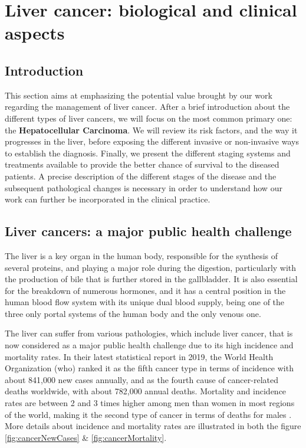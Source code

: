 \chapter{Liver cancer: biological and clinical aspects} \label{liverCancer}

\section{Introduction}

This section aims at emphasizing the potential value brought by our work
regarding the management of liver cancer.
After a brief introduction about the different types of liver cancers,
we will focus on the most common primary one: the \textbf{Hepatocellular
Carcinoma}. We will review its risk factors, and the way it progresses in
the liver, before exposing the different invasive or non-invasive ways
to establish the diagnosis. Finally, we present the
different staging systems and treatments available to provide the better
chance of survival to the diseased patients. A precise description of
the different stages of the disease and the subsequent pathological
changes is necessary in order to understand how our work can further be
incorporated in the clinical practice.

\section{Liver cancers: a major public health challenge}\label{liver_cancer_description}

The liver is a key organ in the human body, responsible for the
synthesis of several proteins, and playing a major role during the
digestion, particularly with the production of bile that is further
stored in the gallbladder. It is also essential for the breakdown of
numerous hormones, and it has a central position in the human blood flow
system with its unique dual blood supply, being one of the three only portal
systems of the human body and the only venous one.

The liver can suffer from various pathologies, which
include liver cancer, that is now considered as a major public health
challenge due to its high incidence and mortality rates. In their latest
statistical report in 2019, the World Health Organization (\ac{who}) ranked it as the fifth
cancer type in terms of incidence with about 841,000 new cases annually,
and as the fourth cause of cancer-related deaths worldwide, with about
782,000 annual deaths. Mortality and incidence rates are between 2 and 3
times higher among men than women in most regions of the world, making
it the second type of cancer in terms of deaths for males \cite{F.Bray2018a}. More details about incidence and mortality rates are illustrated in both the figure \ref{fig:cancerNewCases} \& \ref{fig:cancerMortality}. \\

